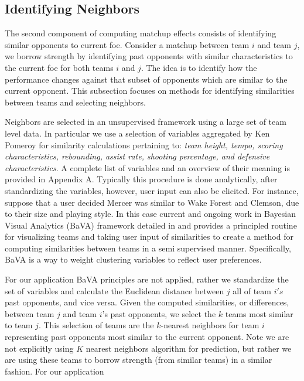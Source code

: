 \documentclass[letterpaper,12pt]{article}
\begin{document}
\subsection{Identifying Neighbors}
The second component of computing matchup effects consists of identifying similar opponents to current foe. Consider a matchup between team $i$ and team $j$, we borrow strength by identifying past opponents with similar characteristics to the current foe for both teams $i$ and $j$. The idea is to identify how the performance changes against that subset of opponents which are similar to the current opponent. This subsection focuses on methods for identifying similarities between teams and selecting neighbors.

Neighbors are selected in an unsupervised framework using a large set of team level data. In particular we use a selection of variables aggregated by Ken Pomeroy \citep{kenpom.com} for similarity calculations pertaining to: \emph{team height, tempo, scoring characteristics, rebounding,  assist rate, shooting percentage, and defensive characteristics}. A complete list of variables and an overview of their meaning is provided in Appendix A. Typically this procedure is done analytically, after standardizing the variables, however, user input can also be elicited. For instance, suppose that a user decided Mercer was similar to Wake Forest and Clemson, due to their size and playing style. In this case current and ongoing work in Bayesian Visual Analytics (BaVA) framework detailed in \cite{house2010}  and \cite{hu2013} provides a principled routine for visualizing teams and taking user input of similarities to create a method for computing similarities between teams in a semi supervised manner. Specifically, BaVA is a way to weight clustering variables to reflect user preferences.

For our application BaVA principles are not applied, rather we standardize the set of variables and calculate the Euclidean distance between $j$ all of team $i's$ past opponents, and vice versa. Given the computed similarities, or differences, between team $j$ and team $i$'s past opponents, we select the $k$ teams most similar to team $j$. This selection of teams are the $k$-nearest neighbors for team $i$ representing past opponents most similar to the current opponent. Note we are not explicitly using $K$ nearest neighbors algorithm for prediction, but rather we are using these teams to borrow strength (from similar teams) in a similar fashion. For our application
\end{document}
